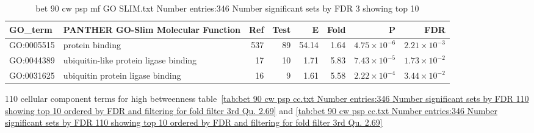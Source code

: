 \begin{table}[ht]
\centering
\begin{tabular}{llrrrrrr}
  \hline
GO\_term & PANTHER GO-Slim Molecular Function & Ref & Test & E & Fold & P & FDR \\ 
  \hline
GO:0005515 & protein binding  & 537 & 89 & 54.14 & 1.64 & $4.75 \times 10^{-6}$ & $2.21 \times 10^{-3}$ \\ 
  GO:0044389 & ubiquitin-like protein ligase binding  & 17 & 10 & 1.71 & 5.83 & $7.43 \times 10^{-5}$ & $1.73 \times 10^{-2}$ \\ 
  GO:0031625 & ubiquitin protein ligase binding  & 16 & 9 & 1.61 & 5.58 & $2.22 \times 10^{-4}$ & $3.44 \times 10^{-2}$ \\ 
  \hline
\end{tabular}
\caption{bet 90 cw psp mf GO SLIM.txt Number entries:346 Number significant sets by FDR 3 showing top 10} 
\label{tab:bet 90 cw psp mf GO SLIM.txt Number entries:346 Number significant sets by FDR 3 showing top 10}
\end{table}

110 cellular component terms for high betweenness table~\ref{tab:bet 90 cw psp cc.txt Number entries:346 Number significant sets by FDR 110 showing top 10 ordered by FDR and filtering for fold filter 3rd Qu. 2.69} and \ref{tab:bet 90 cw psp cc.txt Number entries:346 Number significant sets by FDR 110 showing top 10 ordered by FDR and filtering for fold filter 3rd Qu. 2.69}


